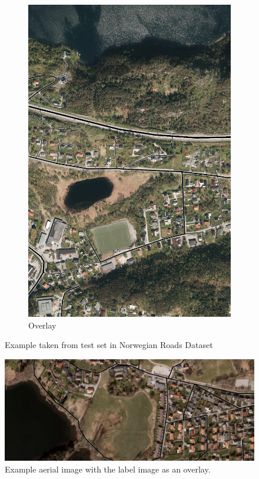 \begin{figure}
\begin{subfigure}{0.32\textwidth}
\includegraphics[width=\linewidth]{figs/datasets/Norwegian_roads_overlay_example.png}
\caption{Overlay} \label{fig:norwegian_roads_example_overlay}
\end{subfigure}
\hspace*{\fill} %
\caption{Example taken from test set in Norwegian Roads Dataset} \label{fig:norwegian_roads_example}
\end{figure}

\begin{figure}[t]
\begin{center}
\includegraphics[width=1\columnwidth]{figs/norwegian_dataset.png}
\caption[Norwegian road dataset example]{Example aerial image with the label image as an overlay.}
\label{fig:aerialimage_norwegian}
\end{center}
\end{figure}

